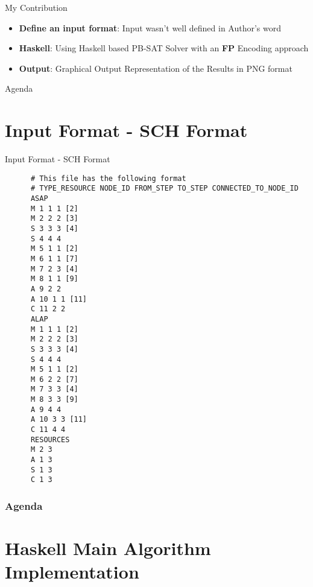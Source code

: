 \documentclass{beamer}
\begin{document}
\begin{frame}[fragile]{My Contribution}
  \begin{block}{}
    \begin{itemize}
      \item \textbf{Define an input format}: Input wasn't well defined in Author's word
      \item \textbf{Haskell}: Using Haskell based PB-SAT Solver with an \textbf{FP} Encoding approach
      \item \textbf{Output}: Graphical Output Representation of the Results in PNG format
    \end{itemize}
  \end{block}
\end{frame}

\begin{frame}{Agenda}
  \section{Input Format - SCH Format}
  \tableofcontents[currentsection]
\end{frame}

\begin{frame}[fragile]{Input Format - SCH Format}
    \begin{verbatim}
      # This file has the following format
      # TYPE_RESOURCE NODE_ID FROM_STEP TO_STEP CONNECTED_TO_NODE_ID
      ASAP
      M 1 1 1 [2]
      M 2 2 2 [3]
      S 3 3 3 [4]
      S 4 4 4
      M 5 1 1 [2]
      M 6 1 1 [7]
      M 7 2 3 [4]
      M 8 1 1 [9]
      A 9 2 2
      A 10 1 1 [11]
      C 11 2 2
      ALAP
      M 1 1 1 [2]
      M 2 2 2 [3]
      S 3 3 3 [4]
      S 4 4 4
      M 5 1 1 [2]
      M 6 2 2 [7]
      M 7 3 3 [4]
      M 8 3 3 [9]
      A 9 4 4
      A 10 3 3 [11]
      C 11 4 4
      RESOURCES
      M 2 3
      A 1 3
      S 1 3
      C 1 3
     \end{verbatim}  
\end{frame}

\begin{frame}
  \frametitle{Agenda}
  \section{Haskell Main Algorithm Implementation}
  \tableofcontents[currentsection]
\end{frame}
\end{document}
